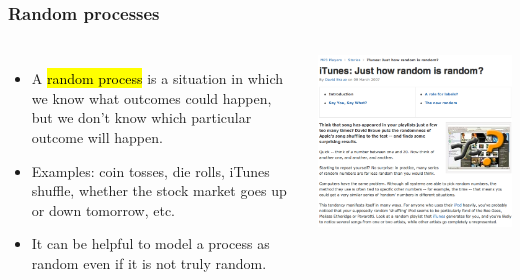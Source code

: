 \documentclass[notes,11pt, aspectratio=169]{beamer}
\begin{document}
\begin{frame}
\frametitle{Random processes}

\begin{columns}
\begin{itemize}

\item A \hl{random process} is a situation in which we know what outcomes could happen, but we don't know which particular outcome will happen.

\item Examples: coin tosses, die rolls, iTunes shuffle, whether the stock market goes up or down tomorrow, etc.

\item It can be helpful to model a process as random even if it is not truly random.

\end{itemize}
\begin{center}
\includegraphics[width=\textwidth]{3-1_define_probability/figures/iTunes}
\end{center}
\end{columns}


\end{frame}


\end{document}

